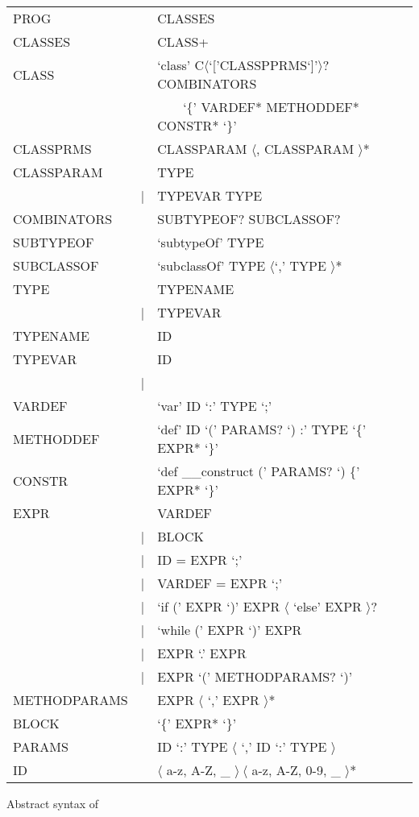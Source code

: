 \begin{listing}
	\begin{tabular}[H]{lrll}
		PROG & \lra & CLASSES \\
		CLASSES & \lra & CLASS+ \\
		CLASS & \lra & `class' C$\langle$`['CLASSPPRMS`]'$\rangle$? COMBINATORS \\
		& & ~~~~`\{' VARDEF* METHODDEF* CONSTR* `\}' \\
		CLASSPRMS & \lra & CLASSPARAM $\langle$, CLASSPARAM $\rangle$* \\
		CLASSPARAM & \lra & TYPE \\
		 & | & TYPEVAR \match TYPE \\
		COMBINATORS & \lra & SUBTYPEOF? SUBCLASSOF? \\
		SUBTYPEOF & \lra & `subtypeOf' TYPE \\
		SUBCLASSOF & \lra & `subclassOf' TYPE $\langle$`,' TYPE $\rangle$* \\
		TYPE & \lra & TYPENAME \\
		& | & TYPEVAR \\
		TYPENAME & \lra & ID \\
		TYPEVAR & \lra & ID \\
		& | & \mytype \\
		VARDEF & \lra & `var' ID `:' TYPE `;' \\
		METHODDEF & \lra & `def' ID `(' PARAMS? `) :' TYPE `\{' EXPR* `\}'  \\
		CONSTR & \lra & `def \_\_construct (' PARAMS? `) \{' EXPR* `\}' \\
		EXPR & \lra & VARDEF \\
		& | & BLOCK \\
		& | & ID = EXPR `;' \\
		& | & VARDEF = EXPR `;' \\
		& | & `if (' EXPR `)' EXPR $\langle$ `else' EXPR $\rangle$?  \\
		& | & `while (' EXPR `)' EXPR \\
		& | & EXPR `.' EXPR \\
		& | & EXPR `(' METHODPARAMS? `)' \\
		METHODPARAMS & \lra & EXPR $\langle$ `,' EXPR $\rangle$* \\
		BLOCK & \lra & `\{' EXPR* `\}' \\
		PARAMS & \lra & ID `:' TYPE $\langle$ `,' ID `:' TYPE $\rangle$ \\
		ID & \lra & $\langle$ a-z, A-Z, \_ $\rangle~\langle$ a-z, A-Z, 0-9, \_ $\rangle$* \\
	\end{tabular}
	\caption{Abstract syntax of \ooplss}
	\label{lst:abstractSyntax}
\end{listing}

